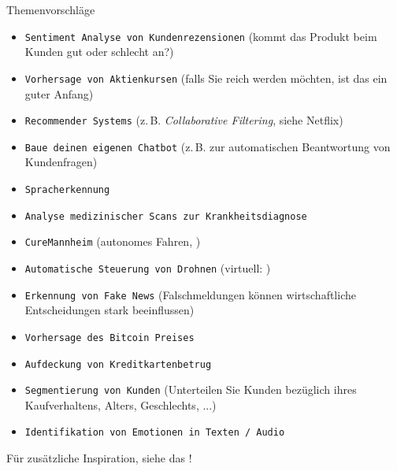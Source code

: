 \begin{dwHeaderFrame}{Themenvorschläge}
	\begin{itemize} 
		\item \texttt{Sentiment Analyse von Kundenrezensionen} (kommt das Produkt beim Kunden gut oder schlecht an?)
		\item \texttt{Vorhersage von Aktienkursen} (falls Sie reich werden möchten, ist das ein guter Anfang)
		\item \texttt{Recommender Systems} (z.\,B. \textit{Collaborative Filtering}, siehe Netflix)
		\item \texttt{Baue deinen eigenen Chatbot} (z.\,B. zur automatischen Beantwortung von Kundenfragen)
		\item \texttt{Spracherkennung}
		\item \texttt{Analyse medizinischer Scans zur Krankheitsdiagnose}
		\item \texttt{CureMannheim} (autonomes Fahren, \curemannheim)
		\item \texttt{Automatische Steuerung von Drohnen} (virtuell: \airsim)
		\item \texttt{Erkennung von \glqq{}Fake News\grqq{}} (Falschmeldungen können wirtschaftliche Entscheidungen stark beeinflussen)
	\end{itemize}
\end{dwHeaderFrame}


\begin{frame}
	\begin{itemize}
		\item \texttt{Vorhersage des Bitcoin Preises}
		\item \texttt{Aufdeckung von Kreditkartenbetrug}
		\item \texttt{Segmentierung von Kunden} (Unterteilen Sie Kunden bezüglich ihres Kaufverhaltens, Alters, Geschlechts, ...)
		\item \texttt{Identifikation von Emotionen in Texten / Audio}
	\end{itemize}
	
	\vspace*{4mm}
	Für zusätzliche Inspiration, siehe das \uci!
\end{frame}


\makethanks

